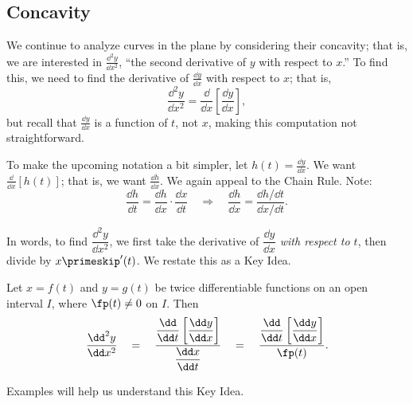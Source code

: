 \subsection{Concavity}

We continue to analyze curves in the plane by considering their concavity; that is, we are interested in $\frac{\dd^2y}{\dd x^2}$, ``the second derivative of $y$ with respect to $x$.'' To find this, we need to find the derivative of $\frac{\dd y}{\dd x}$ with respect to $x$; that is,
\[\frac{\dd^2y}{\dd x^2}=\frac{\dd}{\dd x}\left[\frac{\dd y}{\dd x}\right],\]
but recall that $\frac{\dd y}{\dd x}$ is a function of $t$, not $x$, making this computation not straightforward. 

To make the upcoming notation a bit simpler, let $h(t) = \frac{\dd y}{\dd x}$. We want $\frac{\dd}{\dd x}[h(t)]$; that is, we want $\frac{\dd h}{\dd x}$. We again appeal to the Chain Rule. Note:
\[
\frac{\dd h}{\dd t} = \frac{\dd h}{\dd x}\cdot\frac{\dd x}{\dd t}
\quad \Rightarrow \quad
\frac{\dd h}{\dd x} = \frac{\dd h/\dd t}{\dd x/\dd t}.
\]

In words, to find $\dfrac{\dd^2y}{\dd x^2}$, we first take the derivative of $\dfrac{\dd y}{\dd x}$ \emph{with respect to $t$}, then divide by $x\primeskip'(t)$. We restate this as a Key Idea.

\begin{keyidea}\label{idea:second_der_par}
Let $x=f(t)$ and $y=g(t)$ be twice differentiable functions on an open interval $I$, where $\fp(t)\neq 0$ on $I$. Then 
\[
\frac{\dd^2y}{\dd x^2}
\quad = \quad
\frac{\dfrac{\dd}{\dd t}\left[\dfrac{\dd y}{\dd x}\right]}{\dfrac{\dd x}{\dd t}}
\quad=\quad
\frac{\dfrac{\dd}{\dd t}\left[\dfrac{\dd y}{\dd x}\right]}{\fp(t)}.
\] 
\end{keyidea}

Examples will help us understand this Key Idea.


